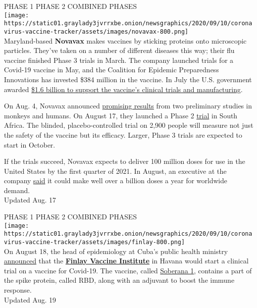 PHASE 1 PHASE 2 COMBINED PHASES\\
\texttt{[image: https://static01.graylady3jvrrxbe.onion/newsgraphics/2020/09/10/coronavirus-vaccine-tracker/assets/images/novavax-800.png]}\\
Maryland-based \textbf{\textbf{Novavax}} makes vaccines by sticking
proteins onto microscopic particles. They've taken on a number of
different diseases this way; their flu vaccine finished Phase 3 trials
in March. The company launched trials for a Covid-19 vaccine in May, and
the Coalition for Epidemic Preparedness Innovations has invested \$384
million in the vaccine. In July the U.S. government awarded
\href{https://www.nytimes3xbfgragh.onion/2020/07/07/health/novavax-coronavirus-vaccine-warp-speed.html}{\$1.6
billion to support the vaccine's clinical trials and manufacturing}.

On Aug. 4, Novavax announced
\href{https://www.nytimes3xbfgragh.onion/2020/08/04/health/covid-19-vaccine-novavax.html}{promising
results} from two preliminary studies in monkeys and humans. On August
17, they launched a Phase 2
\href{https://clinicaltrials.gov/ct2/show/NCT04533399}{trial} in South
Africa. The blinded, placebo-controlled trial on 2,900 people will
measure not just the safety of the vaccine but its efficacy. Larger,
Phase 3 trials are expected to start in October.

If the trials succeed, Novavax expects to deliver 100 million doses for
use in the United States by the first quarter of 2021. In August, an
executive at the company
\href{https://www.fiercepharma.com/pharma/novavax-aims-for-billions-covid-19-vaccine-doses-2021-more-than-enough-to-supply-u-s}{said}
it could make well over a billion doses a year for worldwide demand.\\
Updated Aug. 17

PHASE 1 PHASE 2 COMBINED PHASES\\
\texttt{[image: https://static01.graylady3jvrrxbe.onion/newsgraphics/2020/09/10/coronavirus-vaccine-tracker/assets/images/finlay-800.png]}\\
On August 18, the head of epidemiology at Cuba's public health ministry
\href{https://www.dw.com/en/cuba-joins-the-race-for-vaccine-against-the-coronavirus/a-54615364}{announced}
that the \textbf{\textbf{\href{https://www.finlay.edu.cu/en/}{Finlay
Vaccine Institute}}} in Havana would start a clinical trial on a vaccine
for Covid-19. The vaccine, called
\href{https://rpcec.sld.cu/ensayos/RPCEC00000332-Sp}{Soberana 1},
contains a part of the spike protein, called RBD, along with an adjuvant
to boost the immune response.\\
Updated Aug. 19

